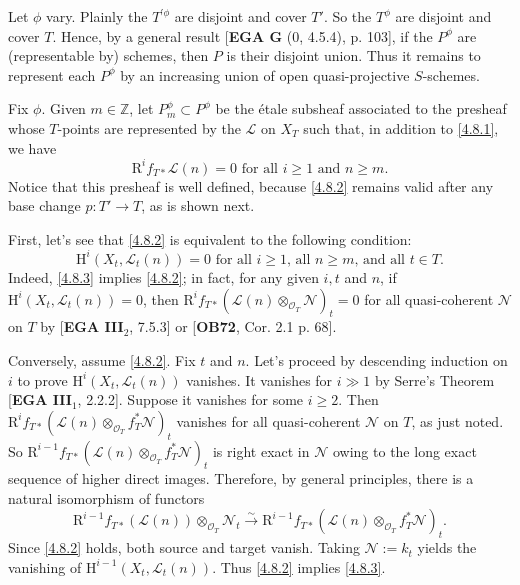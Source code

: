 \documentclass{article}
\begin{document}
Let $\phi$ vary. Plainly the $T^{\prime\phi}$ are disjoint and cover $T'$. So the $T^{\phi}$ are disjoint and cover $T$. Hence, by a general result [\textbf{EGA G} (0, 4.5.4), p. 103], if the $P^{\phi}$ are (representable by) schemes, then $P$ is their disjoint union. Thus it remains to represent each $P^{\phi}$ by an increasing union of open quasi-projective $S$-schemes.

Fix $\phi$. Given $m \in \mathbb{Z}$, let $P^{\phi}_m \subset P^{\phi}$ be the \'{e}tale subsheaf associated to the presheaf whose $T$-points are represented by the $\mathcal{L}$ on $X_T$ such that, in addition to \eqref{4.8.1}, we have
\begin{equation}\label{4.8.2}
\mathrm{R}^i f_{T*} \mathcal{L}(n) = 0 \text{ for all } i \ge 1 \text{ and } n \ge m.
\end{equation}
Notice that this presheaf is well defined, because \eqref{4.8.2} remains valid after any base change $p: T' \to T$, as is shown next.

First, let's see that \eqref{4.8.2} is equivalent to the following condition:
\begin{equation}\label{4.8.3}
\mathrm{H}^i(X_t, \mathcal{L}_t(n)) = 0 \text{ for all } i \ge 1\text{, all } n \ge m\text{, and all } t \in T.
\end{equation}
Indeed, \eqref{4.8.3} implies \eqref{4.8.2}; in fact, for any given $i, t$ and $n$, if $\mathrm{H}^i(X_t, \mathcal{L}_t(n)) = 0$, then $\mathrm{R}^i f_{T*} (\mathcal{L}(n) \otimes_{\mathcal{O}_T} \mathcal{N})_t = 0$ for all quasi-coherent $\mathcal{N}$ on $T$ by [\textbf{EGA III}$_2$, 7.5.3] or [\textbf{OB72}, Cor. 2.1 p. 68].

Conversely, assume \eqref{4.8.2}. Fix $t$ and $n$. Let's proceed by descending induction on $i$ to prove $\mathrm{H}^i(X_t, \mathcal{L}_t(n))$ vanishes. It vanishes for $i \gg 1$ by Serre's Theorem [\textbf{EGA III}$_1$, 2.2.2]. Suppose it vanishes for some $i \ge 2$. Then $\mathrm{R}^i f_{T*} (\mathcal{L}(n) \otimes_{\mathcal{O}_T} f_T^* \mathcal{N})_t$ vanishes for all quasi-coherent $\mathcal{N}$ on $T$, as just noted. So $\mathrm{R}^{i-1} f_{T*} (\mathcal{L}(n) \otimes_{\mathcal{O}_T} f_T^* \mathcal{N})_t$ is right exact in $\mathcal{N}$ owing to the long exact sequence of higher direct images. Therefore, by general principles, there is a natural isomorphism of functors
\[
\mathrm{R}^{i-1} f_{T*} (\mathcal{L}(n)) \otimes_{\mathcal{O}_T} \mathcal{N}_t \xrightarrow{\sim} \mathrm{R}^{i-1} f_{T*} (\mathcal{L}(n) \otimes_{\mathcal{O}_T} f_T^* \mathcal{N})_t.
\]
Since \eqref{4.8.2} holds, both source and target vanish. Taking $\mathcal{N} := k_t$ yields the vanishing of $\mathrm{H}^{i-1}(X_t, \mathcal{L}_t(n))$. Thus \eqref{4.8.2} implies \eqref{4.8.3}.
\end{document}

